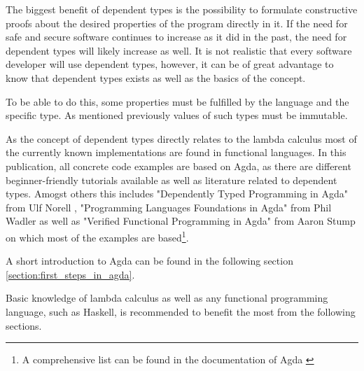 The biggest benefit of dependent types is the possibility to formulate constructive proofs about the desired properties of the program directly in it.
If the need for safe and secure software continues to increase as it did in the past, the need for dependent types will likely increase as well.
It is not realistic that every software developer will use dependent types, however, it can be of great advantage to know that dependent types exists as well as the basics of the concept.

To be able to do this, some properties must be fulfilled by the language and the specific type. 
As mentioned previously values of such types must be immutable. 

As the concept of dependent types directly relates to the lambda calculus most of the currently known implementations are found in functional languages. 
In this publication, all concrete code examples are based on Agda, as there are different beginner-friendly tutorials available as well as literature related to dependent types. Amogst others this includes "Dependently Typed Programming in Agda" from Ulf Norell \cite{norell:deptyped}, "Programming Languages Foundations in Agda" from Phil Wadler \cite{plfa2019} as well as "Verified Functional Programming in Agda" from Aaron Stump \cite{10.1145/2841316} on which most of the examples are based\footnote{A comprehensive list can be found in the documentation of Agda \cite{AgdaReadTheDocs}}.

A short introduction to Agda can be found in the following section \ref{section:first_steps_in_agda}.

Basic knowledge of lambda calculus as well as any functional programming language, such as Haskell, is recommended to benefit the most from the following sections.
